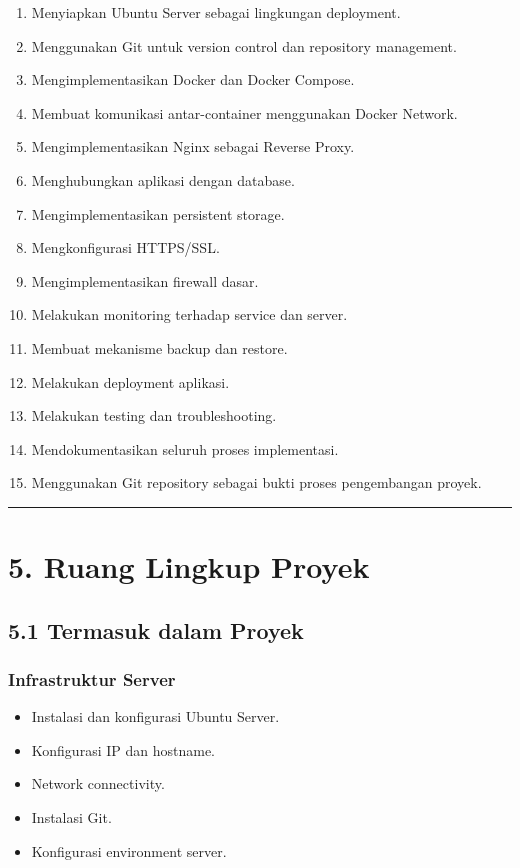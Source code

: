 \documentclass[
]{article}
\providecommand{\tightlist}{%
  \setlength{\itemsep}{0pt}\setlength{\parskip}{0pt}}
\begin{document}
\begin{enumerate}
\def\labelenumi{\arabic{enumi}.}
\tightlist
\item
  Menyiapkan Ubuntu Server sebagai lingkungan deployment.
\item
  Menggunakan Git untuk version control dan repository management.
\item
  Mengimplementasikan Docker dan Docker Compose.
\item
  Membuat komunikasi antar-container menggunakan Docker Network.
\item
  Mengimplementasikan Nginx sebagai Reverse Proxy.
\item
  Menghubungkan aplikasi dengan database.
\item
  Mengimplementasikan persistent storage.
\item
  Mengkonfigurasi HTTPS/SSL.
\item
  Mengimplementasikan firewall dasar.
\item
  Melakukan monitoring terhadap service dan server.
\item
  Membuat mekanisme backup dan restore.
\item
  Melakukan deployment aplikasi.
\item
  Melakukan testing dan troubleshooting.
\item
  Mendokumentasikan seluruh proses implementasi.
\item
  Menggunakan Git repository sebagai bukti proses pengembangan proyek.
\end{enumerate}

\begin{center}\rule{0.5\linewidth}{0.5pt}\end{center}

\section{5. Ruang Lingkup Proyek}\label{ruang-lingkup-proyek}

\subsection{5.1 Termasuk dalam Proyek}\label{termasuk-dalam-proyek}

\subsubsection{Infrastruktur Server}\label{infrastruktur-server}

\begin{itemize}
\tightlist
\item
  Instalasi dan konfigurasi Ubuntu Server.
\item
  Konfigurasi IP dan hostname.
\item
  Network connectivity.
\item
  Instalasi Git.
\item
  Konfigurasi environment server.
\end{itemize}
\end{document}
